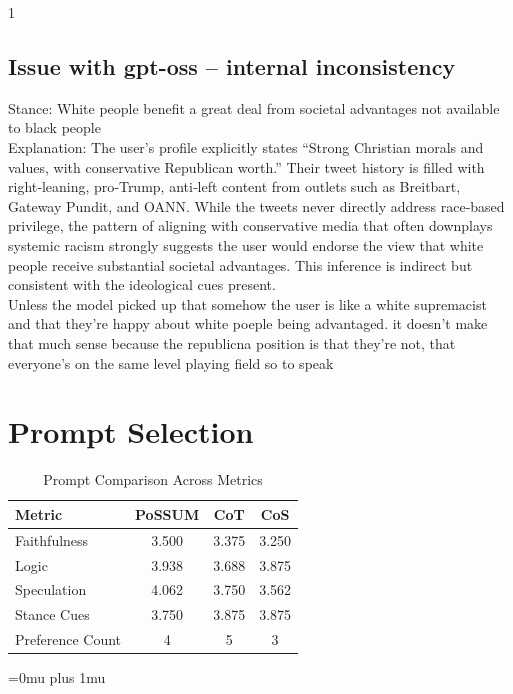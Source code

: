 \begin{spacing}{1}
\subsection{Issue with gpt-oss -- internal inconsistency}
Stance: White people benefit a great deal from societal advantages not available to black people\\
Explanation: The user’s profile explicitly states “Strong Christian morals and values, with conservative Republican worth.” Their tweet history is filled with right‑leaning, pro‑Trump, anti‑left content from outlets such as Breitbart, Gateway Pundit, and OANN. While the tweets never directly address race‑based privilege, the pattern of aligning with conservative media that often downplays systemic racism strongly suggests the user would endorse the view that white people receive substantial societal advantages. This inference is indirect but consistent with the ideological cues present.\\
Unless the model picked up that somehow the user is like a white supremacist and that they're happy about white poeple being advantaged. it doesn't make that much sense because the republicna position is that they're not, that everyone's on the same level playing field so to speak

\section{Prompt Selection}

\begin{table}[htbp]
\centering
\caption{Prompt Comparison Across Metrics}
\begin{tabular}{lccc}
\toprule
\textbf{Metric} & \textbf{PoSSUM} & \textbf{CoT} & \textbf{CoS} \\
\midrule
Faithfulness     & 3.500 & 3.375 & 3.250 \\
Logic            & 3.938 & 3.688 & 3.875 \\
Speculation      & 4.062 & 3.750 & 3.562 \\
Stance Cues      & 3.750 & 3.875 & 3.875 \\
\midrule
Preference Count & 4     & 5     & 3     \\
\bottomrule
\end{tabular}
\end{table}
\pagebreak
\pagebreak
\Urlmuskip=0mu plus 1mu\relax


\end{spacing}{}

